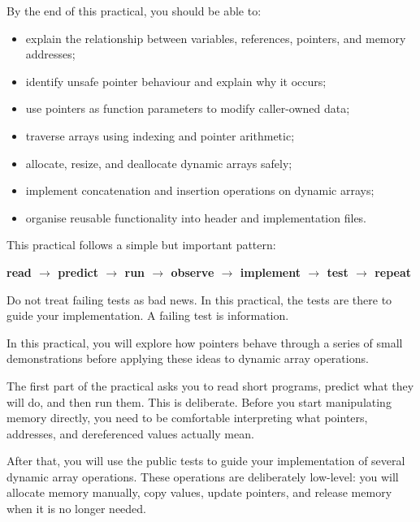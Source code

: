 \documentclass{csc2059practical}
\begin{document}
\maketitle
\tableofcontents
\clearpage

\begin{learningoutcomes}
By the end of this practical, you should be able to:
\begin{itemize}
  \item explain the relationship between variables, references, pointers, and memory addresses;
  \item identify unsafe pointer behaviour and explain why it occurs;
  \item use pointers as function parameters to modify caller-owned data;
  \item traverse arrays using indexing and pointer arithmetic;
  \item allocate, resize, and deallocate dynamic arrays safely;
  \item implement concatenation and insertion operations on dynamic arrays;
  \item organise reusable functionality into header and implementation files.
\end{itemize}
\end{learningoutcomes}

\begin{workflowreminder}
This practical follows a simple but important pattern:
\begin{center}
\textbf{read $\rightarrow$ predict $\rightarrow$ run $\rightarrow$ observe $\rightarrow$ implement $\rightarrow$ test $\rightarrow$ repeat}
\end{center}
Do not treat failing tests as bad news. In this practical, the tests are there to guide your implementation. A failing test is information.
\end{workflowreminder}


In this practical, you will explore how pointers behave through a series of small demonstrations before applying these ideas to dynamic array operations.

The first part of the practical asks you to read short programs, predict what they will do, and then run them. This is deliberate. Before you start manipulating memory directly, you need to be comfortable interpreting what pointers, addresses, and dereferenced values actually mean.

After that, you will use the public tests to guide your implementation of several dynamic array operations. These operations are deliberately low-level: you will allocate memory manually, copy values, update pointers, and release memory when it is no longer needed.
\end{document}
